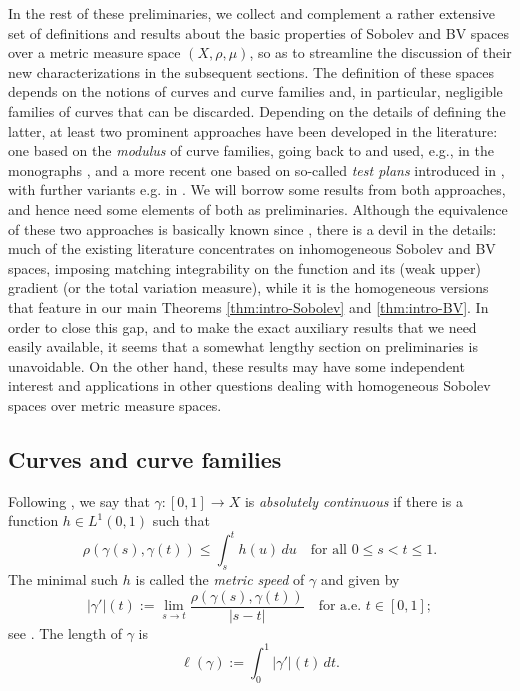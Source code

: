 \documentclass[11pt]{amsart}
\theoremstyle{definition}
\theoremstyle{remark}
\numberwithin{equation}{section}
\newcommand{\abs}[1]{|#1|}
\begin{document}
In the rest of these preliminaries, we collect and complement a rather extensive set of
definitions
and results about the basic properties of Sobolev and BV spaces over a
metric measure space $(X,\rho,\mu)$, so as to streamline the discussion of their
new characterizations in the subsequent sections. The definition of these spaces depends
on the notions of curves and curve families and, in particular, negligible families of
curves
that can be discarded. Depending on the details of defining the latter, at least two
prominent
approaches have been developed in the literature: one based on the {\em modulus} of curve
families,
going back to \cite{HK:96,KM:98} and used, e.g., in the monographs
\cite{Heinonen:book,HKST:book},
and a more recent one based on so-called {\em test plans} introduced in
\cite{AGS:13,AGS:14},
with further variants e.g. in \cite{DMS}. We will borrow some results from both approaches,
and hence need some elements of both as preliminaries. Although the equivalence of these two
approaches is basically known since \cite[Theorem 7.4]{AGS:13},
there is a devil in the details: much of the existing literature concentrates on
inhomogeneous
Sobolev and BV spaces, imposing matching integrability on the function and its (weak upper)
gradient (or the total variation measure), while it is the homogeneous versions that feature
in
our main Theorems \ref{thm:intro-Sobolev} and \ref{thm:intro-BV}. In order to close this
gap, and
to make the exact auxiliary results that we need easily available, it seems that a somewhat
lengthy
section on preliminaries is unavoidable. On the other hand, these results may have some
independent
interest and applications in other questions dealing with homogeneous Sobolev spaces over
metric
measure spaces.

\subsection{Curves and curve families}\label{ss:curves}

Following \cite[Section 2.1]{AGS:13}, we say that
$\gamma:[0,1]\to X$ is \emph{absolutely continuous} if there is a function $h\in L^1(0,1)$
such that
\begin{equation}\label{eq:gamma-AC}
  \rho(\gamma(s),\gamma(t))\leq\int_s^t h(u)\,du\quad\text{for all }0\leq s<t\leq 1.
\end{equation}
The minimal such $h$ is called the \emph{metric speed} of $\gamma$ and given by
\begin{equation}\label{eq:metric-speed}
   \abs{\gamma'}(t):=\lim_{s\to t}\frac{\rho(\gamma(s),\gamma(t))}{\abs{s-t}}\quad\text{for
   a.e. }t\in[0,1];
\end{equation}
see \cite[Theorem 1.1.2]{AGS:book}. The length of $\gamma$ is
\begin{equation*}
  \ell(\gamma):=\int_0^1\abs{\gamma'}(t)\,dt.
\end{equation*}
\end{document}
